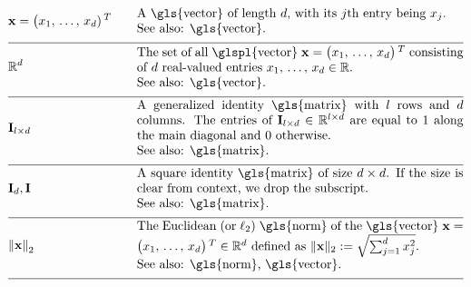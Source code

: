 \begin{align} 
	 &\featurevec=\big(\feature_{1}, \,\ldots, \,\feature_{\featuredim})\,^{T} &\quad & \parbox{.75\textwidth}{A \gls{vector} of length $\featuredim$, with its 
		$\featureidx$th entry being $\feature_{\featureidx}$.
		\\ See also: \gls{vector}. } \nonumber \\[2mm] \hline \nonumber\\[-5mm]
	&\mathbb{R}^{\featuredim} & \quad &  \parbox{.75\textwidth}{The set of all \glspl{vector} $\featurevec=\big(\feature_{1}, \,\ldots, \,\feature_{\featurelen}\big)\,^{T}$ 
		consisting of $\featuredim$ real-valued entries $\feature_{1}, \,\ldots, \,\feature_{\featurelen} \in \mathbb{R}$.
		\\ See also: \gls{vector}. } \nonumber \\[2mm] \hline \nonumber\\[-5mm]
	&\mathbf{I}_{\modelidx \times \featuredim}  & \quad &  \parbox{.75\textwidth}{A generalized identity \gls{matrix} 
		with $\modelidx$ rows and $\featuredim$ columns. The entries of $\mathbf{I}_{\modelidx \times \featuredim} \in \mathbb{R}^{\modelidx \times \featuredim}$ 
		are equal to $1$ along the main diagonal and $0$ otherwise. 
		\\ See also: \gls{matrix}. }\nonumber \\[2mm] \hline \nonumber\\[-5mm] %
	&\mathbf{I}_{\dimlocalmodel}, \mathbf{I} & \quad &  \parbox{.75\textwidth}{A square identity 
		\gls{matrix} of size $\dimlocalmodel \times \dimlocalmodel$. If the size is clear from context, we drop the subscript.
		\\ See also: \gls{matrix}. } \nonumber \\[2mm] \hline \nonumber\\[-5mm]
	&\normgeneric{\featurevec}{2}  &\quad & \parbox{.75\textwidth}{The Euclidean (or $\ell_{2}$) \gls{norm} of the \gls{vector} 
		$\featurevec=\big(\feature_{1}, \,\ldots, \,\feature_{\featurelen}\big)\,^{T} \in \mathbb{R}^{\featuredim}$ defined as 
		$\| \featurevec \|_{2} \defeq \sqrt{\sum_{\featureidx=1}^{\featuredim} \feature_{\featureidx}^{2}}$.
		\\ See also: \gls{norm}, \gls{vector}. } \nonumber \\[2mm] \hline \nonumber\\[-5mm] 

\end{align}
